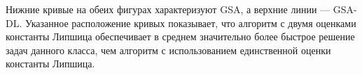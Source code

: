 \documentclass[runningheads]{llncs}
\begin{document}
Нижние кривые на обеих фигурах характеризуют GSA, а верхние линии — GSA-DL. Указанное расположение кривых показывает, что алгоритм с двумя оценками константы Липшица обеспечивает в среднем значительно более быстрое решение задач данного класса, чем алгоритм с использованием единственной оценки константы Липшица.


%
%




\end{document}
